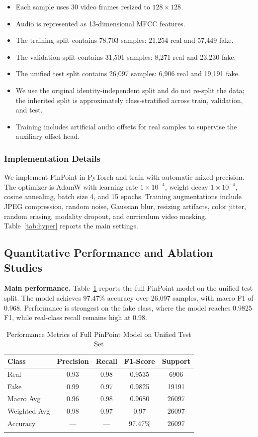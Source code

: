 \documentclass[pdflatex,sn-mathphys-num]{sn-jnl}
\begin{document}
\begin{itemize}
\item Each sample uses 30 video frames resized to $128 \times 128$.
\item Audio is represented as 13-dimensional MFCC features.
\item The training split contains 78,703 samples: 21,254 real and 57,449 fake.
\item The validation split contains 31,501 samples: 8,271 real and 23,230 fake.
\item The unified test split contains 26,097 samples: 6,906 real and 19,191 fake.
\item We use the original identity-independent split and do not re-split the data; the inherited split is approximately class-stratified across train, validation, and test.
\item Training includes artificial audio offsets for real samples to supervise the auxiliary offset head.
\end{itemize}


\subsubsection{Implementation Details}\label{sec5.1.3}

We implement PinPoint in PyTorch and train with automatic mixed precision. The optimizer is AdamW with learning rate $1\times10^{-4}$, weight decay $1\times10^{-4}$, cosine annealing, batch size 4, and 15 epochs. Training augmentations include JPEG compression, random noise, Gaussian blur, resizing artifacts, color jitter, random erasing, modality dropout, and curriculum video masking. Table~\ref{tab:hyper} reports the main settings.


\subsection{Quantitative Performance and Ablation Studies}\label{sec5.2}

\textbf{Main performance.} Table~\ref{tab3} reports the full PinPoint model on the unified test split. The model achieves 97.47\% accuracy over 26,097 samples, with macro F1 of 0.968. Performance is strongest on the fake class, where the model reaches 0.9825 F1, while real-class recall remains high at 0.98.

\begin{table}[htbp]
\caption{Performance Metrics of Full PinPoint Model on Unified Test Set}\label{tab3}
\begin{tabular}{@{}lcccc@{}}
\toprule
\textbf{Class} & \textbf{Precision} & \textbf{Recall} & \textbf{F1-Score} & \textbf{Support} \\
\midrule
Real & 0.93 & 0.98 & 0.9535 & 6906 \\
Fake & 0.99 & 0.97 & 0.9825 & 19191 \\
\midrule
Macro Avg & 0.96 & 0.98 & 0.9680 & 26097 \\
Weighted Avg & 0.98 & 0.97 & 0.97 & 26097 \\
Accuracy & --- & --- & 97.47\% & 26097 \\
\botrule
\end{tabular}
\end{table}
\end{document}
